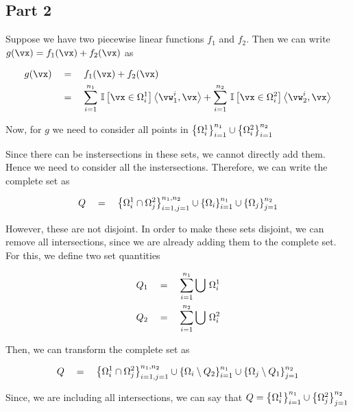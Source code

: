 \documentclass{article}
\begin{document}
\begin{mlsolution}
	\subsection*{Part 2}
	\begin{addmargin}{1.5em}

		Suppose we have two piecewise linear functions $f_1$ and $f_2$. Then we can write $g(\vx) = f_1(\vx) + f_2(\vx)$ as

		\begin{align*}
			g(\vx)	&\eq	f_1(\vx) + f_2(\vx) \\
					&\eq	\sum_{i = 1}^{n_1} \is{\vx \in \Omega_i^1} \ip{\vw_1^i}{\vx} + \sum_{i = 1}^{n_2} \is{\vx \in \Omega_i^2} \ip{\vw_2^i}{\vx}
		\end{align*}

		Now, for $g$ we need to consider all points in $\left\{ \Omega_i^1 \right\}_{i = 1}^{n_1} \cup \left\{ \Omega_i^2 \right\}_{i = 1}^{n_2}$ \br%

		Since there can be instersections in these sets, we cannot directly add them. Hence we need to consider all the instersections. Therefore, we can write the complete set as

		\begin{align*}
			Q	\quad = \quad	\left\{ \Omega_i^1 \cap \Omega_j^2 \right\}_{i = 1, j = 1}^{n_1, n_2} \cup \left\{ \Omega_i \right\}_{i = 1}^{n_1} \cup \left\{ \Omega_j \right\}_{j = 1}^{n_2}
		\end{align*}

		However, these are not disjoint. In order to make these sets disjoint, we can remove all intersections, since we are already adding them to the complete set. For this, we define two set quantities

		\begin{align*}
			Q_1	&\quad = \quad	\sum_{i = 1}^{n_1} \bigcup\, \Omega_i^1 \\
			Q_2	&\quad = \quad	\sum_{i = 1}^{n_2} \bigcup\, \Omega_i^2
		\end{align*}

		Then, we can transform the complete set as

		\begin{align*}
			Q	\quad = \quad	\left\{ \Omega_i^1 \cap \Omega_j^2 \right\}_{i = 1, j = 1}^{n_1, n_2} \cup \left\{ \Omega_i \setminus Q_2 \right\}_{i = 1}^{n_1} \cup \left\{ \Omega_j \setminus Q_1 \right\}_{j = 1}^{n_2}
		\end{align*}

		Since, we are including all intersections, we can say that $Q = \left\{ \Omega_i^1 \right\}_{i = 1}^{n_1} \cup \left\{ \Omega_j^2 \right\}_{j = 1}^{n_2}$ \br%


\end{addmargin}
\end{mlsolution}
\end{document}
